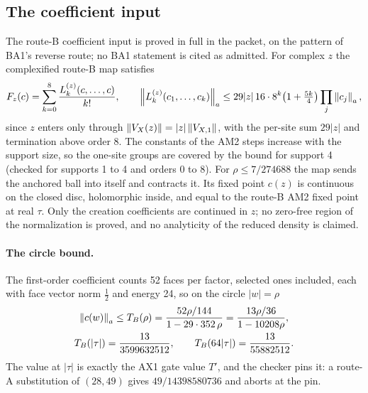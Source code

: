 \subsection{The coefficient input}
\label{sec:bc2-coefficients}
The route-B coefficient input is proved in full in the packet, on the pattern
of BA1's reverse route; no BA1 statement is cited as admitted. For complex
$z$ the complexified route-B map satisfies
\begin{equation}
 F_z(c)=\sum_{k=0}^{8}\frac{L^{(z)}_k(c,\ldots,c)}{k!},\qquad
 \left\lVert L^{(z)}_k(c_1,\ldots,c_k)\right\rVert_a\le29|z|\,16\cdot8^k\bigl(1+\tfrac{5k}4\bigr)\prod_j\left\lVert c_j\right\rVert_a ,
 \label{eq:bc2-complex}
\end{equation}
since $z$ enters only through $\left\lVert V_X(z)\right\rVert=|z|\left\lVert V_{X,1}\right\rVert$, with the
per-site sum $29|z|$ and termination above order 8. The constants of the AM2
steps increase with the support size, so the one-site groups are covered by
the bound for support 4 (checked for supports 1 to 4 and orders 0 to 8). For
$\rho\le7/274688$ the map sends the anchored ball into itself and contracts
it. Its fixed point $c(z)$ is continuous on the closed disc, holomorphic
inside, and equal to the route-B AM2 fixed point at real $\tau$. Only the
creation coefficients are continued in $z$; no zero-free region of the
normalization is proved, and no analyticity of the reduced density is
claimed.

\paragraph{The circle bound.} The first-order coefficient counts 52 faces per
factor, selected ones included, each with face vector norm $\tfrac12$ and
energy 24, so on the circle $|w|=\rho$
\begin{equation}
 \begin{gathered}
 \left\lVert c(w)\right\rVert_a\le T_B(\rho)=\frac{52\rho/144}{1-29\cdot352\,\rho}
 =\frac{13\rho/36}{1-10208\rho},\\
 T_B(|\tau|)=\frac{13}{3599632512},\qquad T_B(64|\tau|)=\frac{13}{55882512}.
 \end{gathered}
 \label{eq:bc2-circle}
\end{equation}
The value at $|\tau|$ is exactly the AX1 gate value $T'$, and the checker
pins it: a route-A substitution of $(28,49)$ gives $49/14398580736$ and
aborts at the pin.

